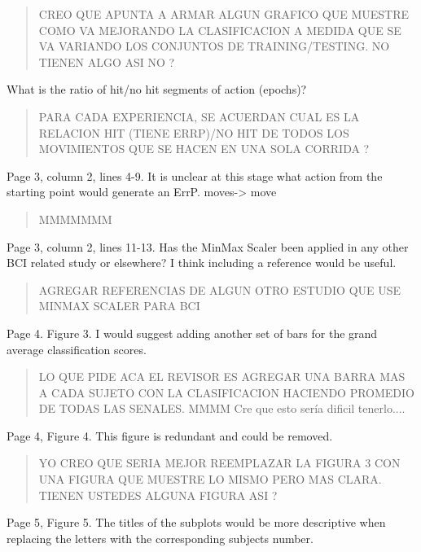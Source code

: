 \documentclass[journal,onecolumn,12pt]{IEEEtran}
\begin{document}
\begin{quotation}
{\color{blue}
CREO QUE APUNTA A ARMAR ALGUN GRAFICO QUE MUESTRE COMO VA MEJORANDO LA CLASIFICACION A MEDIDA QUE SE VA VARIANDO LOS CONJUNTOS DE TRAINING/TESTING.  NO TIENEN ALGO ASI NO ?
}
\end{quotation}


What is the ratio of hit/no hit segments of action (epochs)?


\begin{quotation}
{\color{blue}
PARA CADA EXPERIENCIA, SE ACUERDAN CUAL ES LA RELACION HIT (TIENE ERRP)/NO HIT DE TODOS LOS MOVIMIENTOS QUE SE HACEN EN UNA SOLA CORRIDA ?
}
\end{quotation}


Page 3, column 2, lines 4-9. It is unclear at this stage what action from the starting point would generate an ErrP.
moves-> move

\begin{quotation}
{\color{blue}
MMMMMMM
}
\end{quotation}


Page 3, column 2, lines 11-13. Has the MinMax Scaler been applied in any other BCI related study or elsewhere? I think including a reference would be useful.

\begin{quotation}
{\color{blue}
AGREGAR REFERENCIAS DE ALGUN OTRO ESTUDIO QUE USE MINMAX SCALER PARA BCI
}
\end{quotation}

Page 4. Figure 3. I would suggest adding another set of bars for the grand average classification scores.

\begin{quotation}
{\color{blue}
LO QUE PIDE ACA EL REVISOR ES AGREGAR UNA BARRA MAS A CADA SUJETO CON LA CLASIFICACION HACIENDO PROMEDIO DE TODAS LAS SENALES.  MMMM Cre que esto sería dificil tenerlo....
}
\end{quotation}

Page 4, Figure 4. This figure is redundant and could be removed.

\begin{quotation}
{\color{blue}
YO CREO QUE SERIA MEJOR REEMPLAZAR LA FIGURA 3 CON UNA FIGURA QUE MUESTRE LO MISMO PERO MAS CLARA.  TIENEN USTEDES ALGUNA FIGURA ASI ?
}
\end{quotation}


Page 5, Figure 5. The titles of the subplots would be more descriptive when replacing the letters with the corresponding subjects number.
\end{document}
